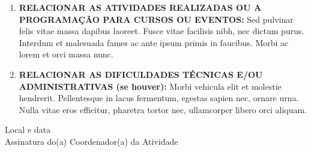 \documentclass[12pt,a4paper,oneside]{article}%
\begin{document}
\begin{enumerate}
\item%
\textbf{RELACIONAR AS ATIVIDADES REALIZADAS OU A PROGRAMAÇÃO PARA CURSOS OU EVENTOS: }%
Sed pulvinar felis vitae massa dapibus laoreet. Fusce vitae facilisis nibh, nec dictum purus. Interdum et malesuada fames ac ante ipsum primis in faucibus. Morbi ac lorem et orci massa nunc.%
\item%
\textbf{RELACIONAR AS DIFICULDADES TÉCNICAS E/OU ADMINISTRATIVAS (se houver): }%
Morbi vehicula elit et molestie hendrerit. Pellentesque in lacus fermentum, egestas sapien nec, ornare urna. Nulla vitae eros efficitur, pharetra tortor nec, ullamcorper libero orci aliquam.%
\end{enumerate}%
\raggedleft%
\bigskip%
\begin{minipage}{.5\textwidth}%
\begin{center}%
\hrulefill%
\newline%
\bigskip%
Local e data \\%
\hrulefill%
\newline%
\bigskip%
Assinatura do(a) Coordenador(a) da Atividade%
\end{center}%
\end{minipage}%
\end{document}
